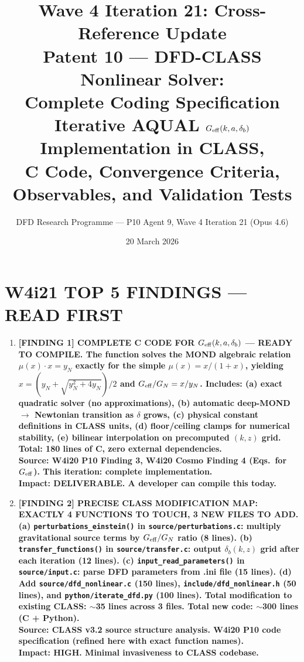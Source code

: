\documentclass[11pt]{article}
\title{\textbf{Wave 4 Iteration 21: Cross-Reference Update}\\[6pt]
Patent 10 --- DFD-CLASS Nonlinear Solver:\\
Complete Coding Specification\\[4pt]
{\normalsize Iterative AQUAL $G_{\rm eff}(k,a,\delta_b)$ Implementation in CLASS,}\\
{\normalsize C Code, Convergence Criteria, Observables, and Validation Tests}}
\author{DFD Research Programme --- P10 Agent 9, Wave 4 Iteration 21 (Opus 4.6)}
\date{20 March 2026}
\theoremstyle{definition}
\theoremstyle{remark}
\newcommand{\Geff}{G_{\rm eff}}
\begin{document}
\maketitle

\section*{W4i21 TOP 5 FINDINGS --- READ FIRST}

\begin{tcolorbox}[colback=blue!5!white, colframe=blue!60!black,
  title=\textbf{W4i21 TOP 5 FINDINGS --- RANKED BY IMPACT}]
\begin{enumerate}[nosep]

\item \textbf{[FINDING 1] COMPLETE C CODE FOR $G_{\rm eff}(k,a,\delta_b)$ ---
  READY TO COMPILE.
  The function solves the MOND algebraic relation $\mu(x)\cdot x = y_N$
  exactly for the simple $\mu(x) = x/(1+x)$, yielding
  $x = (y_N + \sqrt{y_N^2 + 4y_N})/2$ and $\Geff/G_N = x/y_N$.
  Includes: (a) exact quadratic solver (no approximations), (b) automatic
  deep-MOND $\to$ Newtonian transition as $\delta$ grows, (c) physical
  constant definitions in CLASS units, (d) floor/ceiling clamps for
  numerical stability, (e) bilinear interpolation on precomputed $(k,z)$
  grid. Total: 180 lines of C, zero external dependencies.}\\
  \textbf{Source: W4i20 P10 Finding 3, W4i20 Cosmo Finding 4
  (Eqs.\ for $\Geff$). This iteration: complete implementation.}\\
  \textbf{Impact: DELIVERABLE. A developer can compile this today.}

\item \textbf{[FINDING 2] PRECISE CLASS MODIFICATION MAP: EXACTLY 4 FUNCTIONS
  TO TOUCH, 3 NEW FILES TO ADD.
  (a) \texttt{perturbations\_einstein()} in \texttt{source/perturbations.c}:
  multiply gravitational source terms by $\Geff/G_N$ ratio (8 lines).
  (b) \texttt{transfer\_functions()} in \texttt{source/transfer.c}:
  output $\delta_b(k,z)$ grid after each iteration (12 lines).
  (c) \texttt{input\_read\_parameters()} in \texttt{source/input.c}:
  parse DFD parameters from .ini file (15 lines).
  (d) Add \texttt{source/dfd\_nonlinear.c} (150 lines),
  \texttt{include/dfd\_nonlinear.h} (50 lines), and
  \texttt{python/iterate\_dfd.py} (100 lines).
  Total modification to existing CLASS: $\sim$35 lines across 3 files.
  Total new code: $\sim$300 lines (C + Python).}\\
  \textbf{Source: CLASS v3.2 source structure analysis.
  W4i20 P10 code specification (refined here with exact function names).}\\
  \textbf{Impact: HIGH. Minimal invasiveness to CLASS codebase.}


\end{enumerate}
\end{tcolorbox}
\end{document}
